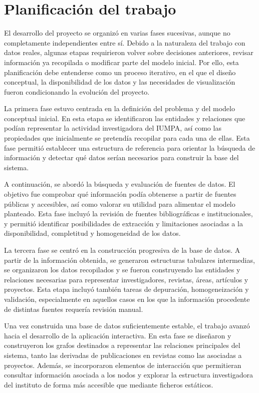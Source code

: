 \documentclass[11pt,spanish,listoffigures,listoftables]{tfgetsinf}
\begin{document}
\section{Planificación del trabajo}

El desarrollo del proyecto se organizó en varias fases sucesivas, aunque no completamente independientes entre sí. Debido a la naturaleza del trabajo con datos reales, algunas etapas requirieron volver sobre decisiones anteriores, revisar información ya recopilada o modificar parte del modelo inicial. Por ello, esta planificación debe entenderse como un proceso iterativo, en el que el diseño conceptual, la disponibilidad de los datos y las necesidades de visualización fueron condicionando la evolución del proyecto.

La primera fase estuvo centrada en la definición del problema y del modelo conceptual inicial. En esta etapa se identificaron las entidades y relaciones que podían representar la actividad investigadora del IUMPA, así como las propiedades que inicialmente se pretendía recopilar para cada una de ellas. Esta fase permitió establecer una estructura de referencia para orientar la búsqueda de información y detectar qué datos serían necesarios para construir la base del sistema.

A continuación, se abordó la búsqueda y evaluación de fuentes de datos. El objetivo fue comprobar qué información podía obtenerse a partir de fuentes públicas y accesibles, así como valorar su utilidad para alimentar el modelo planteado. Esta fase incluyó la revisión de fuentes bibliográficas e institucionales, y permitió identificar posibilidades de extracción y limitaciones asociadas a la disponibilidad, completitud y homogeneidad de los datos.

La tercera fase se centró en la construcción progresiva de la base de datos. A partir de la información obtenida, se generaron estructuras tabulares intermedias, se organizaron los datos recopilados y se fueron construyendo las entidades y relaciones necesarias para representar investigadores, revistas, áreas, artículos y proyectos. Esta etapa incluyó también tareas de depuración, homogeneización y validación, especialmente en aquellos casos en los que la información procedente de distintas fuentes requería revisión manual.

Una vez construida una base de datos suficientemente estable, el trabajo avanzó hacia el desarrollo de la aplicación interactiva. En esta fase se diseñaron y construyeron los grafos destinados a representar las relaciones principales del sistema, tanto las derivadas de publicaciones en revistas como las asociadas a proyectos. Además, se incorporaron elementos de interacción que permitieran consultar información asociada a los nodos y explorar la estructura investigadora del instituto de forma más accesible que mediante ficheros estáticos.
\end{document}
